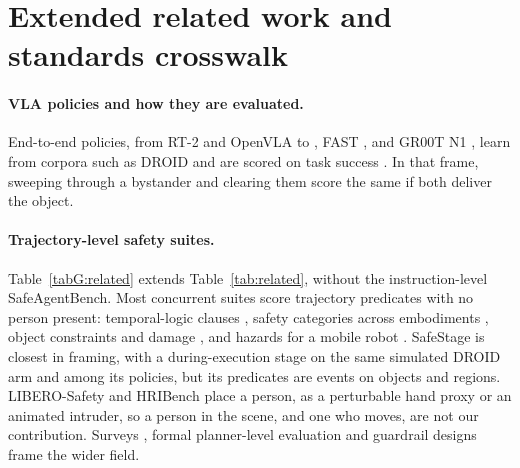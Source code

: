 \section{Extended related work and standards crosswalk}
\label{app:relwork}

\paragraph{VLA policies and how they are evaluated.}
End-to-end policies, from RT-2 \citep{ref3} and OpenVLA \citep{ref4} to \pizero{} \citep{ref62}, FAST \citep{ref64}, \pifive{} \citep{ref63} and GR00T N1 \citep{ref5}, learn from corpora such as DROID \citep{ref65} and are scored on task success \citep{ref6,ref7,ref14,ref66}.
In that frame, sweeping through a bystander and clearing them score the same if both deliver the object.

\paragraph{Trajectory-level safety suites.}
Table~\ref{tabG:related} extends Table~\ref{tab:related}, without the instruction-level SafeAgentBench.
Most concurrent suites score trajectory predicates with no person present: temporal-logic clauses \citep{ref27,ref30}, safety categories across embodiments \citep{ref23}, object constraints and damage \citep{ref69,ref71,ref72}, and hazards for a mobile robot \citep{ref21}.
SafeStage \citep{ref61} is closest in framing, with a during-execution stage on the same simulated DROID arm and \pifive{} among its policies, but its predicates are events on objects and regions.
LIBERO-Safety \citep{ref24} and HRIBench \citep{ref68} place a person, as a perturbable hand proxy or an animated intruder, so a person in the scene, and one who moves, are not our contribution.
Surveys \citep{ref28,ref29}, formal planner-level evaluation \citep{ref31} and guardrail designs \citep{ref82} frame the wider field.

